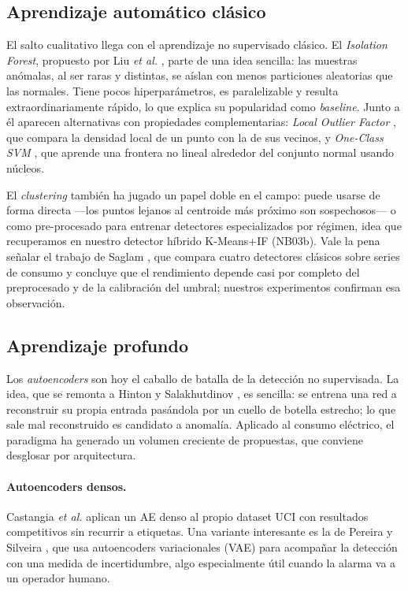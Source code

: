 \subsection{Aprendizaje automático clásico}

El salto cualitativo llega con el aprendizaje no supervisado clásico. El \textit{Isolation Forest}, propuesto por Liu \emph{et al.} \cite{liu2008isolation,liu2012iforest}, parte de una idea sencilla: las muestras anómalas, al ser raras y distintas, se aíslan con menos particiones aleatorias que las normales. Tiene pocos hiperparámetros, es paralelizable y resulta extraordinariamente rápido, lo que explica su popularidad como \textit{baseline}. Junto a él aparecen alternativas con propiedades complementarias: \textit{Local Outlier Factor} \cite{breunig2000lof}, que compara la densidad local de un punto con la de sus vecinos, y \textit{One-Class SVM} \cite{scholkopf2001ocsvm}, que aprende una frontera no lineal alrededor del conjunto normal usando núcleos.

El \textit{clustering} también ha jugado un papel doble en el campo: puede usarse de forma directa ---los puntos lejanos al centroide más próximo son sospechosos--- o como pre-procesado para entrenar detectores especializados por régimen, idea que recuperamos en nuestro detector híbrido K-Means+IF (NB03b). Vale la pena señalar el trabajo de Saglam \cite{saglam2023ml}, que compara cuatro detectores clásicos sobre series de consumo y concluye que el rendimiento depende casi por completo del preprocesado y de la calibración del umbral; nuestros experimentos confirman esa observación.

\subsection{Aprendizaje profundo}

Los \textit{autoencoders} son hoy el caballo de batalla de la detección no supervisada. La idea, que se remonta a Hinton y Salakhutdinov \cite{hinton2006reducing}, es sencilla: se entrena una red a reconstruir su propia entrada pasándola por un cuello de botella estrecho; lo que sale mal reconstruido es candidato a anomalía. Aplicado al consumo eléctrico, el paradigma ha generado un volumen creciente de propuestas, que conviene desglosar por arquitectura.

\paragraph{Autoencoders densos.} Castangia \emph{et al.} \cite{castangia2022density} aplican un AE denso al propio dataset UCI con resultados competitivos sin recurrir a etiquetas. Una variante interesante es la de Pereira y Silveira \cite{pereira2018unsupervised}, que usa autoencoders variacionales (VAE) para acompañar la detección con una medida de incertidumbre, algo especialmente útil cuando la alarma va a un operador humano.

